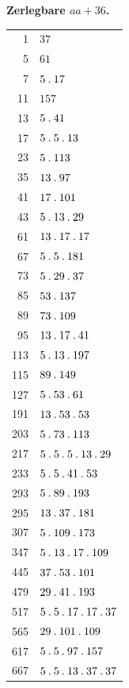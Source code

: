 \par{}
\begin{center}\textbf{Zerlegbare $aa+36$.}\end{center}
\begingroup\small\setlength{\tabcolsep}{5pt}
\begin{longtable}{@{}r|l@{}}
1 & $37$\\
5 & $61$\\
7 & $5\mathbin{.} 17$\\
11 & $157$\\
13 & $5\mathbin{.} 41$\\
17 & $5\mathbin{.} 5\mathbin{.} 13$\\
23 & $5\mathbin{.} 113$\\
35 & $13\mathbin{.} 97$\\
41 & $17\mathbin{.} 101$\\
43 & $5\mathbin{.} 13\mathbin{.} 29$\\
61 & $13\mathbin{.} 17\mathbin{.} 17$\\
67 & $5\mathbin{.} 5\mathbin{.} 181$\\
73 & $5\mathbin{.} 29\mathbin{.} 37$\\
85 & $53\mathbin{.} 137$\\
89 & $73\mathbin{.} 109$\\
95 & $13\mathbin{.} 17\mathbin{.} 41$\\
113 & $5\mathbin{.} 13\mathbin{.} 197$\\
115 & $89\mathbin{.} 149$\\
127 & $5\mathbin{.} 53\mathbin{.} 61$\\
191 & $13\mathbin{.} 53\mathbin{.} 53$\\
203 & $5\mathbin{.} 73\mathbin{.} 113$\\
217 & $5\mathbin{.} 5\mathbin{.} 5\mathbin{.} 13\mathbin{.} 29$\\
233 & $5\mathbin{.} 5\mathbin{.} 41\mathbin{.} 53$\\
293 & $5\mathbin{.} 89\mathbin{.} 193$\\
295 & $13\mathbin{.} 37\mathbin{.} 181$\\
307 & $5\mathbin{.} 109\mathbin{.} 173$\\
347 & $5\mathbin{.} 13\mathbin{.} 17\mathbin{.} 109$\\
445 & $37\mathbin{.} 53\mathbin{.} 101$\\
479 & $29\mathbin{.} 41\mathbin{.} 193$\\
517 & $5\mathbin{.} 5\mathbin{.} 17\mathbin{.} 17\mathbin{.} 37$\\
565 & $29\mathbin{.} 101\mathbin{.} 109$\\
617 & $5\mathbin{.} 5\mathbin{.} 97\mathbin{.} 157$\\
667 & $5\mathbin{.} 5\mathbin{.} 13\mathbin{.} 37\mathbin{.} 37$\\

\end{longtable}

